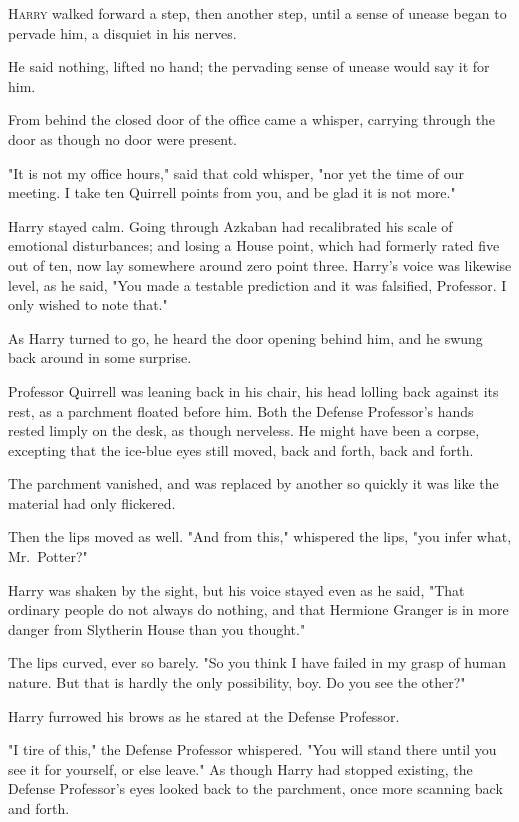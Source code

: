 
\lettrine{H}{arry} walked 
forward a step, then another step, until a sense of unease began to pervade 
him, a disquiet in his nerves.

He said nothing, lifted no hand; the pervading sense of unease would say it for 
him.

From behind the closed door of the office came a whisper, carrying through the 
door as though no door were present.

"It is not my office hours," said that cold whisper, "nor yet the time of our 
meeting. I take ten Quirrell points from you, and be glad it is not more."

Harry stayed calm. Going through Azkaban had recalibrated his scale of 
emotional disturbances; and losing a House point, which had formerly rated five 
out of ten, now lay somewhere around zero point three. Harry's voice was 
likewise level, as he said, "You made a testable prediction and it was 
falsified, Professor. I only wished to note that."

As Harry turned to go, he heard the door opening behind him, and he swung back 
around in some surprise.

Professor Quirrell was leaning back in his chair, his head lolling back against 
its rest, as a parchment floated before him. Both the Defense Professor's hands 
rested limply on the desk, as though nerveless. He might have been a corpse, 
excepting that the ice-blue eyes still moved, back and forth, back and forth.

The parchment vanished, and was replaced by another so quickly it was like the 
material had only flickered.

Then the lips moved as well. "And from this," whispered the lips, "you infer 
what, Mr.~Potter?"

Harry was shaken by the sight, but his voice stayed even as he said, "That 
ordinary people do not always do nothing, and that Hermione Granger is in more 
danger from Slytherin House than you thought."

The lips curved, ever so barely. "So you think I have failed in my grasp of 
human nature. But that is hardly the only possibility, boy. Do you see the 
other?"

Harry furrowed his brows as he stared at the Defense Professor.

"I tire of this," the Defense Professor whispered. "You will stand there until 
you see it for yourself, or else leave." As though Harry had stopped existing, 
the Defense Professor's eyes looked back to the parchment, once more scanning 
back and forth.

